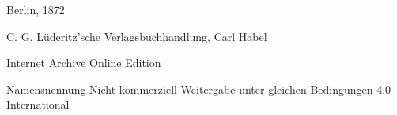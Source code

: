 \documentclass[a4paper, 11pt, oneside, english]{article}
\begin{document}
\begin{titlepage}
		
		
	\vspace*{\fill}%


	{Berlin, 1872} %
 
        {\small C. G. Lüderitz'sche Verlagsbuchhandlung, Carl Habel}

	\vspace{1\baselineskip} %

    Internet Archive Online Edition  %
	
	{\small Namensnennung Nicht-kommerziell Weitergabe unter gleichen Bedingungen 4.0 International } %
\end{titlepage}
\clearpage
\pagestyle{fancy}
\fancyhf{}
\cfoot{\swabfamily{\thepage}}
\Large
\setlength{\parskip}{1mm plus1mm minus1mm}
\end{document}
